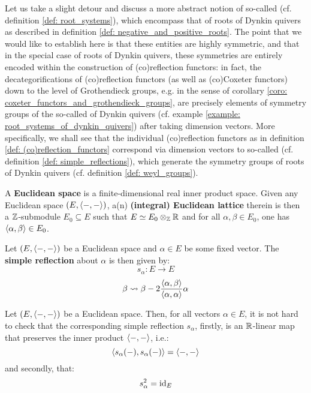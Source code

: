             Let us take a slight detour and discuss a more abstract notion of so-called  (cf. definition \ref{def: root_systems}), which encompass that of roots of Dynkin quivers as described in definition \ref{def: negative_and_positive_roots}. The point that we would like to establish here is that these entities are highly symmetric, and that in the special case of roots of Dynkin quivers, these symmetries are entirely encoded within the construction of (co)reflection functors: in fact, the decategorifications of (co)reflection functors (as well as (co)Coxeter functors) down to the level of Grothendieck groups, e.g. in the sense of corollary \ref{coro: coxeter_functors_and_grothendieck_groups}, are precisely elements of symmetry groups of the so-called  of Dynkin quivers (cf. example \ref{example: root_systems_of_dynkin_quivers}) after taking dimension vectors. More specifically, we shall see that the individual (co)reflection functors as in definition \ref{def: (co)reflection_functors} correspond via dimension vectors to so-called  (cf. definition \ref{def: simple_reflections}), which generate the symmetry groups of roots of Dynkin quivers (cf. definition \ref{def: weyl_groups}). 
            \begin{definition} \label{defL euclidean_spaces}
                A \textbf{Euclidean space} is a finite-dimensional real inner product space. Given any Euclidean space $(E, \langle-, -\rangle)$, a(n) \textbf{(integral) Euclidean lattice} therein is then a $\mathbb{Z}$-submodule $E_0 \subseteq E$ such that $E \cong E_0 \tensor_{\Z} \R$ and for all $\alpha, \beta \in E_0$, one has $\langle\alpha, \beta\rangle \in E_0$.
            \end{definition}
            \begin{definition} \label{def: simple_reflections}
                Let $(E, \langle-, -\rangle)$ be a Euclidean space and $\alpha \in E$ be some fixed vector. The \textbf{simple reflection} about $\alpha$ is then given by:
                    $$s_{\alpha}: E \to E$$
                    $$\beta \leadsto \beta - 2\frac{\langle\alpha, \beta\rangle}{\langle\alpha, \alpha\rangle} \alpha$$
            \end{definition}
            \begin{remark} \label{remark: simple_reflections_are_involutive_isometries}
                Let $(E, \langle-, -\rangle)$ be a Euclidean space. Then, for all vectors $\alpha \in E$, it is not hard to check that the corresponding simple reflection $s_{\alpha}$, firstly, is an $\mathbb{R}$-linear map that preserves the inner product $\langle-, -\rangle$, i.e.:
                    $$\langle s_{\alpha}(-), s_{\alpha}(-)\rangle = \langle-, -\rangle$$
                and secondly, that:
                    $$s_{\alpha}^2 = \mathrm{id}_E$$
            \end{remark}

